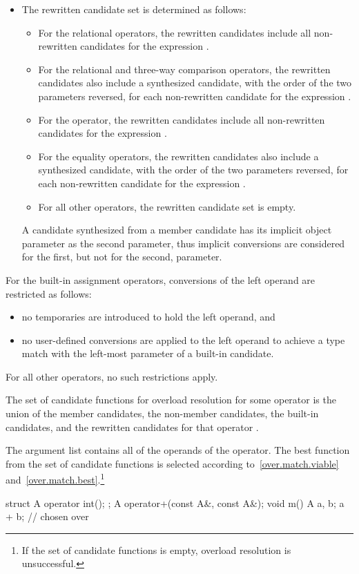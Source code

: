 \begin{itemize}
\item
The rewritten candidate set is determined as follows:
\begin{itemize}
\item
For the relational operators,
the rewritten candidates include
all non-rewritten candidates
for the expression .
\item
For the
relational and
three-way comparison
operators,
the rewritten candidates also include
a synthesized candidate,
with the order of the two parameters reversed,
for each non-rewritten candidate
for the expression
.
\item
For the \tcode{!=} operator,
the rewritten candidates
include all non-rewritten candidates
for the expression .
\item
For the equality operators,
the rewritten candidates also include a synthesized candidate,
with the order of the two parameters reversed,
for each non-rewritten candidate
for the expression .
\item
For all other operators, the rewritten candidate set is empty.
\end{itemize}
\begin{note}
A candidate synthesized from a member candidate has its implicit
object parameter as the second parameter, thus implicit conversions
are considered for the first, but not for the second, parameter.
\end{note}
\end{itemize}

\pnum
For the built-in assignment operators, conversions of the left
operand are restricted as follows:
\begin{itemize}
\item
no temporaries are introduced to hold the left operand, and
\item
no user-defined conversions are applied to the left operand to achieve
a type match with the left-most parameter of a built-in candidate.
\end{itemize}

\pnum
For all other operators, no such restrictions apply.

\pnum
The set of candidate functions for overload resolution
for some operator 
is the
union of
the member candidates,
the non-member candidates,
the built-in candidates,
and the rewritten candidates
for that operator .

\pnum
The argument list contains all of the
operands of the operator.
The best function from the set of candidate functions is selected
according to~\ref{over.match.viable}
and~\ref{over.match.best}.\footnote{If the set of candidate functions is empty,
overload resolution is unsuccessful.}
\begin{example}
\begin{codeblock}
struct A {
  operator int();
};
A operator+(const A&, const A&);
void m() {
  A a, b;
  a + b;                        //  chosen over 
}
\end{codeblock}
\end{example}

